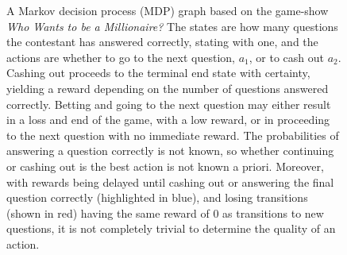 \begin{figure}
    \vspace{1cm}

    \caption[
        Example Markov decision process graph.
    ]
    {
        A Markov decision process (MDP) graph based on the game-show \textit{Who Wants to be a Millionaire?}
        The states are how many questions the contestant has answered correctly, stating with one, and the actions are whether to go to the next question, $a_1$, or to cash out $a_2$.
        Cashing out proceeds to the terminal end state with certainty, yielding a reward depending on the number of questions answered correctly.
        Betting and going to the next question may either result in a loss and end of the game, with a low reward, or in proceeding to the next question with no immediate reward.
        The probabilities of answering a question correctly is not known, so whether continuing or cashing out is the best action is not known a priori.
        Moreover, with rewards being delayed until cashing out or answering the final question correctly (highlighted in blue), and losing transitions (shown in red) having the same reward of 0 as transitions to new questions, it is not completely trivial to determine the quality of an action.
    }
    \label{fig:mdp}
\end{figure}


